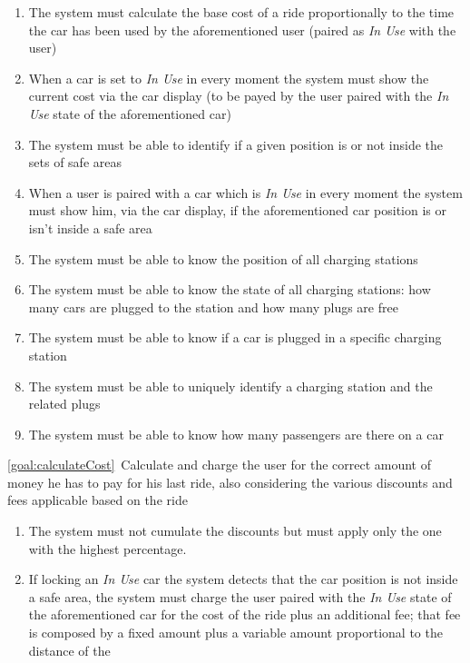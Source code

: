 \begin{description}
\begin{enumerate}[resume*]
  				\item The system must calculate the base cost of a ride proportionally to the time
  				the car has been used by the aforementioned user (paired as \emph{In Use} with the
  				user)
  				\item When a car is set to \emph{In Use} in every moment the system must show the
  				current cost via the car display (to be payed by the user paired with the \emph{In Use}
  				state of the aforementioned car) 
  				\item The system must be able to identify if a given position is or not inside the sets
  				of safe areas
  				\item When a user is paired with a car which is \emph{In Use} in every moment the
  				system must show him, via the car display, if the aforementioned car position is or
  				isn't inside a safe area
  				\item The system must be able to know the position of all charging stations
  				\item The system must be able to know the state of all charging stations: how many
  				cars are plugged to the station and how many plugs are free 
  				\item The system must be able to know if a car is plugged in a specific charging
  				station
  				\item The system must be able to uniquely identify a charging station and the related
  				plugs
  				\item The system must be able to know how many passengers are there on a car	
   			\end{enumerate}
  		\item \ref{goal:calculateCost}\ Calculate and charge the user for the correct amount of money he has to pay for his last ride, also considering the various discounts and fees applicable based on the ride
  			\begin{enumerate}[resume*]
  			    \item The system must not cumulate the discounts but must apply only the one with the
  			    highest percentage.
  				\item If locking an \emph{In Use} car the system detects that the car position is not
  				inside a safe area, the system must charge the user paired with the \emph{In Use} state
  				of the aforementioned car for the cost of the ride plus an additional fee; that fee is
  				composed by a fixed amount plus a variable amount proportional to the distance of the

\end{enumerate}
\end{description}
